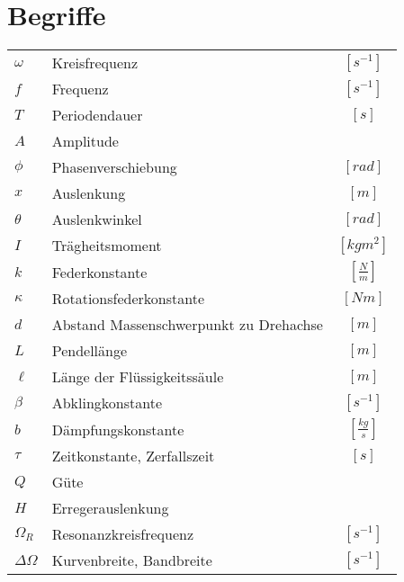 \section{Begriffe}
\begin{table}[h!]
\begin{tabular}{p{} l c}
$\omega$       & Kreisfrequenz 			& $[s^{-1}]$ \\
$f$            & Frequenz 			& $[s^{-1}]$ \\
$T$            & Periodendauer 			& $[s]$ \\
$A$            & Amplitude 			&  \\
$\phi$         & Phasenverschiebung 		& $[rad]$\\
$x$            & Auslenkung 			& $[m]$ \\
$\theta$       & Auslenkwinkel 			& $[rad]$ \\
$I$            & Trägheitsmoment 		& $[kg m^2]$ \\
$k$            & Federkonstante 		& $[\frac{N}{m}]$ \\
$\kappa$       & Rotationsfederkonstante 	& $[Nm]$ \\
$d$            & Abstand Massenschwerpunkt 
		 zu Drehachse 			& $[m]$ \\
$L$            & Pendellänge 			& $[m]$ \\
$\ell$         & Länge der Flüssigkeitssäule 	& $[m]$ \\
$\beta$        & Abklingkonstante 		& $[s^{-1}]$ \\
$b$            & Dämpfungskonstante 		& $[\frac{kg}{s}]$ \\
$\tau$         & Zeitkonstante, Zerfallszeit 	& $[s]$ \\
$Q$            & Güte 				& \\
$H$            & Erregerauslenkung 		& \\
$\Omega_R$     & Resonanzkreisfrequenz 		& $[s^{-1}]$ \\
$\Delta\Omega$ & Kurvenbreite, Bandbreite 	& $[s^{-1}]$ \\
\end{tabular}
\end{table}
